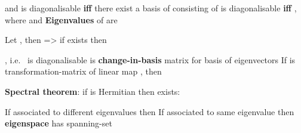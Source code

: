 \begin{itemize}
            \begin{itemize}

                  \vItem
                         and
                  \vItem
                         is diagonalisable \textbf{iff} there exist a basis of
                         consisting of
                  \vItem
                         is diagonalisable \textbf{iff} ,
                        where 
                        and 
                  \vItem
                        \textbf{Eigenvalues} of  are
            \end{itemize}
      \vItem
            Let , then
            => if  exists then

            \begin{itemize}

                  \vItem
                        , i.e.~ is diagonalisable
                  \vItem
                         is \textbf{change-in-basis} matrix for
                        basis
                         of
                        eigenvectors
                  \vItem
                        If  is transformation-matrix of linear
                        map , then
            \end{itemize}
      \vItem
            \textbf{Spectral theorem}: if  is Hermitian then
             exists:

            \begin{itemize}

                  \vItem
                        If  associated to different
                        eigenvalues then 
                        \tcbbreak
                  \vItem
                        If associated to same eigenvalue \iMbox{\lambda} then
                        \textbf{eigenspace}  has spanning-set


\end{itemize}
\end{itemize}
